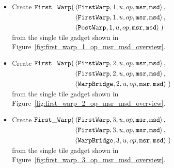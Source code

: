 \begin{itemize}
\begin{itemize}
                \item Create
                $\begin{aligned}[t]
                    \firstwarp(& \left\langle {\tt FirstWarp}, 1, u, \inc, {\tt msr}, {\tt msd} \right\rangle, \\ %
                               & \left\langle {\tt FirstWarp}, 1, u, \inc, {\tt msr}, {\tt msd} \right\rangle, \\ %
                               & \left\langle {\tt PostWarp},  1, u, \inc, {\tt msr}, {\tt msd} \right\rangle \;) %
                \end{aligned}$\\ from the single tile gadget shown in Figure~\ref{fig:first_warp_1_op_msr_msd_overview}.
                \vspace{.5cm}

                \item Create
                $\begin{aligned}[t]
                    \firstwarp(& \left\langle {\tt FirstWarp},  2, u, \inc, {\tt msr}, {\tt msd} \right\rangle, \\ %
                               & \left\langle {\tt FirstWarp},  2, u, \inc, {\tt msr}, {\tt msd} \right\rangle, \\ %
                               & \left\langle {\tt WarpBridge}, 2, u, \inc, {\tt msr}, {\tt msd} \right\rangle \;) %
                \end{aligned}$\\ from the single tile gadget shown in Figure~\ref{fig:first_warp_2_op_msr_msd_overview}.
                \vspace{.5cm}

                \item Create
                $\begin{aligned}[t]
                    \firstwarp(& \left\langle {\tt FirstWarp},  3, u, \inc, {\tt msr}, {\tt msd} \right\rangle,\\  %
                               & \left\langle {\tt FirstWarp},  3, u, \inc, {\tt msr}, {\tt msd} \right\rangle,\\  %
                               & \left\langle {\tt WarpBridge}, 3, u, \inc, {\tt msr}, {\tt msd} \right\rangle \;) %
                \end{aligned}$\\ from the single tile gadget shown in Figure~\ref{fig:first_warp_3_op_msr_msd_overview}.
                \vspace{.5cm}


\end{itemize}
\end{itemize}
